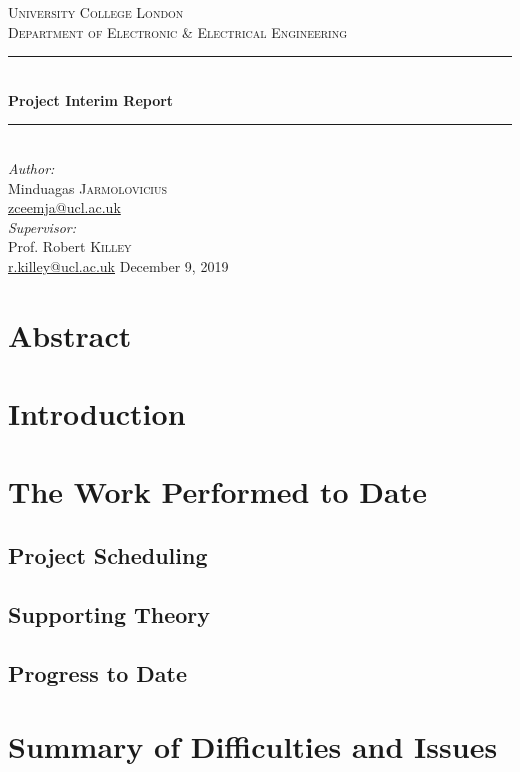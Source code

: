 \documentclass[a4paper,11pt]{article}
\begin{document}
	\begin{titlepage}
		\newcommand{\HRule}{\rule{\linewidth}{0.5mm}}
		\center
		\textsc{\Large University College London}\\[0.5cm]
		\textsc{\large Department of Electronic \& Electrical Engineering}\\[0.5cm]
		
		\HRule \\[0.4cm]
		{ \huge \bfseries Project Interim Report}\\[0.4cm]
		\HRule \\[1.0cm]
		
		\Large \emph{Author:}\\
		Minduagas \textsc{Jarmolovicius}\\
		\href{mailto:zceemja@ucl.ac.uk}{zceemja@ucl.ac.uk}\\[0.5cm]
		
		\Large \emph{Supervisor:}\\
		Prof. Robert \textsc{Killey}\\
		\href{mailto:r.killey@ucl.ac.uk}{r.killey@ucl.ac.uk}
		\vfill
		{\large December 9, 2019}\\[2cm]
		
	\end{titlepage}
\pagebreak
\section{Abstract}
\section{Introduction}
\section{The Work Performed to Date}
\subsection{Project Scheduling}
\subsection{Supporting Theory}
\subsection{Progress to Date}
\section{Summary of Difficulties and Issues}
\end{document}
